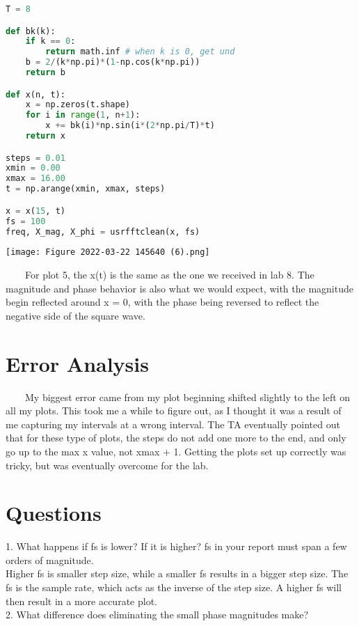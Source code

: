 \documentclass[11pt,a4]{article}
\begin{document}
\begin{lstlisting}[language=Python]
T = 8

def bk(k):
    if k == 0:
        return math.inf # when k is 0, get und
    b = 2/(k*np.pi)*(1-np.cos(k*np.pi))
    return b

def x(n, t):
    x = np.zeros(t.shape)
    for i in range(1, n+1):
        x += bk(i)*np.sin(i*(2*np.pi/T)*t)
    return x

steps = 0.01
xmin = 0.00
xmax = 16.00
t = np.arange(xmin, xmax, steps)

x = x(15, t)
fs = 100
freq, X_mag, X_phi = usrfftclean(x, fs)
\end{lstlisting}

\texttt{[image: Figure 2022-03-22 145640 (6).png]}

\ \ \ \ For plot 5, the x(t) is the same as the one we received in lab 8. The magnitude and phase behavior is also what we would expect, with the magnitude begin reflected around x = 0, with the phase being reversed to reflect the negative side of the square wave.

\section{Error Analysis}

\ \ \ \ My biggest error came from my plot beginning shifted slightly to the left on all my plots. This took me a while to figure out, as I thought it was a result of me capturing my intervals at a wrong interval. The TA eventually pointed out that for these type of plots, the steps do not add one more to the end, and only go up to the max x value, not xmax + 1. Getting the plots set up correctly was tricky, but was eventually overcome for the lab.

\section{Questions}

1. What happens if fs is lower? If it is higher? fs in your report must span a few orders of magnitude.\\

Higher fs is smaller step size, while a smaller fs results in a bigger step size. The fs is the sample rate, which acts as the inverse of the step size. A higher fs will then result in a more accurate plot.\\

2. What difference does eliminating the small phase magnitudes make?\\
\end{document}
